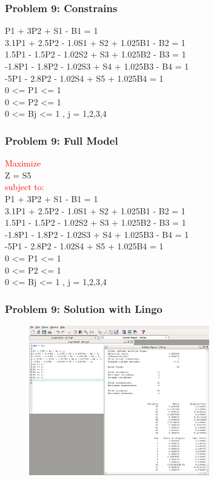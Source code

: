 \documentclass[10pt,svgnames,fragile]{beamer}
\begin{document}
\begin{frame}[label={sec:orge9abdcb}]{}
\frametitle{Problem 9: Constrains }
P1 + 3P2 + S1 - B1 = 1\\
3.1P1 + 2.5P2 - 1.0S1 + S2 + 1.025B1 - B2 = 1\\
1.5P1 - 1.5P2 - 1.02S2 + S3 + 1.025B2 - B3 = 1\\
-1.8P1 - 1.8P2 - 1.02S3 + S4 + 1.025B3 - B4 = 1\\
-5P1 - 2.8P2 - 1.02S4 + S5 + 1.025B4 = 1\\

0 <= P1 <= 1\\
0 <= P2 <= 1\\
0 <= Bj <= 1  ,  j = 1,2,3,4

\end{frame}

\begin{frame}[label={sec:orge9abdcb}]{}
\frametitle{Problem 9: Full Model }
\textcolor{red}{Maximize}\\[1em]
Z = S5\\[1em]
\textcolor{red}{subject to:}\\[1em]
P1 + 3P2 + S1 - B1 = 1\\
3.1P1 + 2.5P2 - 1.0S1 + S2 + 1.025B1 - B2 = 1\\
1.5P1 - 1.5P2 - 1.02S2 + S3 + 1.025B2 - B3 = 1\\
-1.8P1 - 1.8P2 - 1.02S3 + S4 + 1.025B3 - B4 = 1\\
-5P1 - 2.8P2 - 1.02S4 + S5 + 1.025B4 = 1\\

0 <= P1 <= 1\\
0 <= P2 <= 1\\
0 <= Bj <= 1  ,  j = 1,2,3,4
\end{frame}


\begin{frame}[label={sec:orge9abdcb}]{}

\frametitle{Problem 9: Solution with Lingo }
\begin{figure}
\includegraphics[width=0.7\textwidth]{images/9.png}
\end{figure}


\end{frame}
\end{document}

